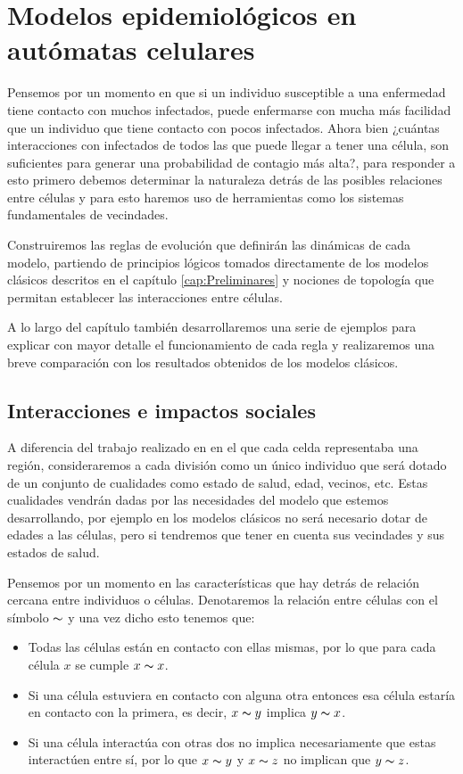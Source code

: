 \chapter{Modelos epidemiológicos en autómatas celulares}\label{cap:Modelos epidemiológicos en AC}

Pensemos por un momento en que si un individuo susceptible a una enfermedad tiene contacto con muchos infectados, puede enfermarse con mucha más facilidad que un individuo que tiene contacto con pocos infectados. Ahora bien ¿cuántas interacciones con infectados de todos las que puede llegar a tener una célula, son suficientes para generar una probabilidad de contagio más alta?, para responder a esto primero debemos determinar la naturaleza detrás de las posibles relaciones entre células y para esto haremos uso de herramientas como los sistemas fundamentales de vecindades.

Construiremos las reglas de evolución que definirán las dinámicas de cada modelo, partiendo de principios lógicos tomados directamente de los modelos clásicos descritos en el capítulo \ref{cap:Preliminares} y nociones de topología que permitan establecer las interacciones entre células.

A lo largo del capítulo también desarrollaremos una serie de ejemplos para explicar con mayor detalle el funcionamiento de cada regla y realizaremos una breve comparación con los resultados obtenidos de los modelos clásicos.

\section{Interacciones e impactos sociales}\label{sec:InteraccionesEImpactosSociales}
A diferencia del trabajo realizado en \cite{populationDensity} en el que cada celda representaba una región, consideraremos a cada división como un único individuo que será dotado de un conjunto de cualidades como estado de salud, edad, vecinos, etc. Estas cualidades vendrán dadas por las necesidades del modelo que estemos desarrollando, por ejemplo en los modelos clásicos no será necesario dotar de edades a las células, pero si tendremos que tener en cuenta sus vecindades y sus estados de salud.

Pensemos por un momento en las características que hay detrás de relación cercana entre individuos o células. Denotaremos la relación entre células con el símbolo $\thicksim$ y una vez dicho esto tenemos que:

\begin{itemize}
    \item Todas las células están en contacto con ellas mismas, por lo que para cada célula $x$ se cumple $x \thicksim x$.
    \item Si una célula estuviera en contacto con alguna otra entonces esa célula estaría en contacto con la primera, es decir, $x\thicksim y$ implica $y\thicksim x$.
    \item Si una célula interactúa con otras dos no implica necesariamente que estas interactúen entre sí, por lo que $x\thicksim y$ y $x\thicksim z$ no implican que $y\thicksim z$.
\end{itemize}

